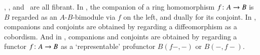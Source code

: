 \documentclass{amsart}
\begin{document}

\begin{egs}
  \lMod, \lnCob, and \lProf\ are all fibrant.  In \lMod, the companion
  of a ring homomorphism $f\colon A\to B$ is $B$ regarded as an
  $A$-$B$-bimodule via $f$ on the left, and dually for its conjoint.
  In \lnCob, companions and conjoints are obtained by regarding a
  diffeomorphism as a cobordism.  And in \lProf, companions and
  conjoints are obtained by regarding a functor $f\colon A\to B$ as a
  `representable' profunctor $B(f-,-)$ or $B(-,f-)$.
\end{egs}
\end{document}
